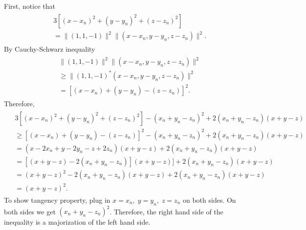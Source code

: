 \documentclass{scrartcl}
\begin{document}
First, notice that
\begin{align}
	\begin{split}
	& 3[(x-x_n)^2+(y-y_n)^2+(z-z_n)^2] \\
	& = \|(1, 1, -1)\|^2\|(x-x_n, y-y_n, z-z_n)\|^2 .
	\end{split}
\end{align}
By Cauchy-Schwarz inequality
\begin{align}
	\begin{split}
	& \|(1, 1, -1)\|^2\|(x-x_n, y-y_n, z-z_n)\|^2   \\
	& \ge \|(1, 1, -1)^*(x-x_n, y-y_n, z-z_n)\|^2   \\
	& = [(x-x_n) + (y-y_n) - (z-z_n)]^2 .
	\end{split}
\end{align}
Therefore,
\begin{align}
	\begin{split}
	& 3[(x-x_n)^2+(y-y_n)^2+(z-z_n)^2]-(x_n+y_n-z_n)^2+2(x_n+y_n-z_n)(x+y-z) \\
	& \ge [(x-x_n)+(y-y_n)-(z-z_n)]^2-(x_n+y_n-z_n)^2+2(x_n+y_n-z_n)(x+y-z) \\
	& = (x-2x_n+y-2y_n-z+2z_n)(x+y-z)+2(x_n+y_n-z_n)(x+y-z) \\
	& = [(x+y-z)-2(x_n+y_n-z_n)](x+y-z)]+2(x_n+y_n-z_n)(x+y-z) \\
	& = (x+y-z)^2-2(x_n+y_n-z_n)(x+y-z)+2(x_n+y_n-z_n)(x+y-z) \\
	& = (x+y-z)^2 .
	\end{split}
\end{align}
To show tangency property, plug in $x=x_n, \; y=y_n, \; z=z_n$ on both sides.
On both sides we get $(x_n+y_n-z_n)^2$.
Therefore, the right hand side of the inequality is a majorization of the
left hand side.
\end{document}

